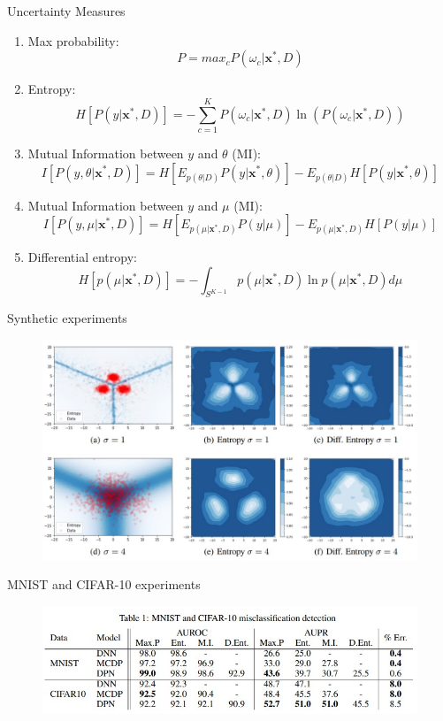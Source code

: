 \documentclass{beamer}
\begin{document}
\begin{frame}{Uncertainty Measures}

\begin{enumerate}
    \item Max probability:
        $$P = max_c P(\omega_c | \mathbf{x}^*, D)$$
    \item Entropy:
        $$H[P(y | \mathbf{x}^*, D)] = - \sum_{c=1}^KP(\omega_c | \mathbf{x}^*, D) \ln(P(\omega_c | \mathbf{x}^*, D))$$
    \item Mutual Information between $y$ and $\theta$ (MI):
         $$I[P(y, \theta | \mathbf{x}^*, D)] = H[E_{p(\theta|D)}P(y | \mathbf{x}^*, \theta)] - E_{p(\theta|D)}H[P(y | \mathbf{x}^*, \theta)]$$
    \item Mutual Information between $y$ and $\mu$ (MI):
        $$I[P(y, \mu | \mathbf{x}^*, D)] = H[E_{p(\mu|\mathbf{x}^*,D)}P(y | \mu)] - E_{p(\mu|\mathbf{x}^*,D)}H[P(y | \mu)]$$
    \item Differential entropy:
        $$H[p(\mu | \mathbf{x}^*, D)] = - \int_{S^{K-1}}p(\mu | \mathbf{x}^*, D) \ln p(\mu | \mathbf{x}^*, D)d\mu$$
\end{enumerate}
\end{frame}
\begin{frame}{Synthetic experiments}
    \begin{figure}[h]
        \includegraphics[scale=0.3]{results.jpg}
     \end{figure}
\end{frame}

\begin{frame}{MNIST and CIFAR-10 experiments}
    \begin{figure}[h]
        \includegraphics[scale=0.6]{images/table1.jpg}
     \end{figure}
\end{frame}
\end{document}
